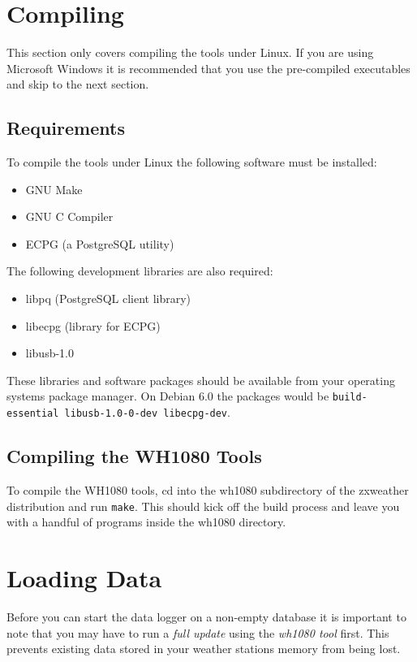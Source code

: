 \documentclass[a4paper,10pt,draft]{book}
\begin{document}
\section{Compiling}
This section only covers compiling the tools under Linux. If you are using Microsoft Windows it is recommended that you use the pre-compiled executables and skip to the next section.

\subsection{Requirements}
To compile the tools under Linux the following software must be installed:
\begin{itemize}
\item GNU Make
\item GNU C Compiler
\item ECPG (a PostgreSQL utility)
\end{itemize}

The following development libraries are also required:
\begin{itemize}
\item libpq (PostgreSQL client library)
\item libecpg (library for ECPG)
\item libusb-1.0
\end{itemize}

These libraries and software packages should be available from your operating systems package manager. On Debian 6.0 the packages would be \verb|build-essential libusb-1.0-0-dev libecpg-dev|.

\subsection{Compiling the WH1080 Tools}


To compile the WH1080 tools, cd into the wh1080 subdirectory of the zxweather distribution and run \verb|make|. This should kick off the build process and leave you with a handful of programs inside the wh1080 directory.

\section{Loading Data}
\label{sec_loading_data}

Before you can start the data logger on a non-empty database it is important to note that you may have to run a \emph{full update} using the \emph{wh1080 tool} first. This prevents existing data stored in your weather stations memory from being lost.
\end{document}
